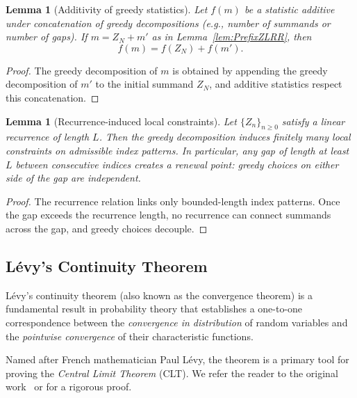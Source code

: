\documentclass[11pt]{amsart}
\theoremstyle{plain}
\numberwithin{equation}{section} %
\newtheorem{lemma}[thm]{Lemma}
\numberwithin{table}{section} %
\numberwithin{figure}{section}
\begin{document}
	\begin{lemma}[Additivity of greedy statistics]
		\label{lem:AdditivityZLRR}
		Let $f(m)$ be a statistic additive under concatenation of greedy
		decompositions (e.g., number of summands or number of gaps). If
		$m=Z_N+m'$ as in Lemma~\ref{lem:PrefixZLRR}, then
		\[
		f(m)=f(Z_N)+f(m').
		\]
	\end{lemma}
	
	\begin{proof}
		The greedy decomposition of $m$ is obtained by appending the greedy
		decomposition of $m'$ to the initial summand $Z_N$, and additive statistics
		respect this concatenation.
	\end{proof}
	
	\begin{lemma}[Recurrence-induced local constraints]
		\label{lem:LocalConstraintsZLRR}
		Let $\{Z_n\}_{n\ge0}$ satisfy a linear recurrence of length $L$. Then the greedy
		decomposition induces finitely many local constraints on admissible index
		patterns. In particular, any gap of length at least $L$ between consecutive
		indices creates a renewal point: greedy choices on either side of the gap are
		independent.
	\end{lemma}
	
	\begin{proof}
		The recurrence relation links only bounded-length index patterns. Once the
		gap exceeds the recurrence length, no recurrence can connect summands across
		the gap, and greedy choices decouple.
	\end{proof}
	
	
	\subsection{Lévy's Continuity Theorem}
	
	Lévy’s continuity theorem (also known as the convergence theorem) is a fundamental result in probability theory that establishes a one-to-one correspondence between the \textit{convergence in distribution} of random variables and the \textit{pointwise convergence} of their characteristic functions.
	
	Named after French mathematician Paul Lévy, the theorem is a primary tool for proving the \textit{Central Limit Theorem} (CLT). We  refer the reader to the original work~\cite{Levy1925} or \cite{FristedtGray1996}  for a rigorous proof.
	
\end{document}
